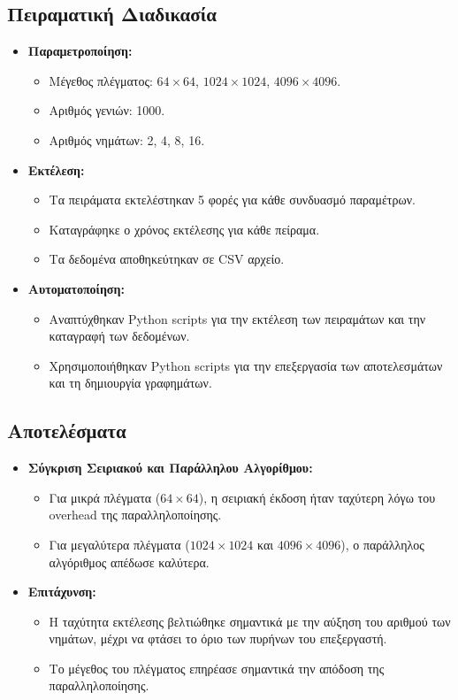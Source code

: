 \documentclass{article}
\begin{document}
\subsection*{Πειραματική Διαδικασία}
\begin{itemize}
    \item \textbf{Παραμετροποίηση:}
    \begin{itemize}
        \item Μέγεθος πλέγματος: $64 \times 64$, $1024 \times 1024$, $4096 \times 4096$.
        \item Αριθμός γενιών: 1000.
        \item Αριθμός νημάτων: 2, 4, 8, 16.
    \end{itemize}
    \item \textbf{Εκτέλεση:}
    \begin{itemize}
        \item Τα πειράματα εκτελέστηκαν 5 φορές για κάθε συνδυασμό παραμέτρων.
        \item Καταγράφηκε ο χρόνος εκτέλεσης για κάθε πείραμα.
        \item Τα δεδομένα αποθηκεύτηκαν σε CSV αρχείο.
    \end{itemize}
    \item \textbf{Αυτοματοποίηση:}
    \begin{itemize}
        \item Αναπτύχθηκαν Python scripts για την εκτέλεση των πειραμάτων και την καταγραφή των δεδομένων.
        \item Χρησιμοποιήθηκαν Python scripts για την επεξεργασία των αποτελεσμάτων και τη δημιουργία γραφημάτων.
    \end{itemize}
\end{itemize}
\subsection*{Αποτελέσματα}
\begin{itemize}
    \item \textbf{Σύγκριση Σειριακού και Παράλληλου Αλγορίθμου:}
    \begin{itemize}
        \item Για μικρά πλέγματα ($64 \times 64$), η σειριακή έκδοση ήταν ταχύτερη λόγω του overhead της παραλληλοποίησης.
        \item Για μεγαλύτερα πλέγματα ($1024 \times 1024$ και $4096 \times 4096$), ο παράλληλος αλγόριθμος απέδωσε καλύτερα.
    \end{itemize}
    \item \textbf{Επιτάχυνση:}
    \begin{itemize}
        \item Η ταχύτητα εκτέλεσης βελτιώθηκε σημαντικά με την αύξηση του αριθμού των νημάτων, μέχρι να φτάσει το όριο των πυρήνων του επεξεργαστή.
        \item Το μέγεθος του πλέγματος επηρέασε σημαντικά την απόδοση της παραλληλοποίησης.
    \end{itemize}
\end{itemize}
\end{document}
